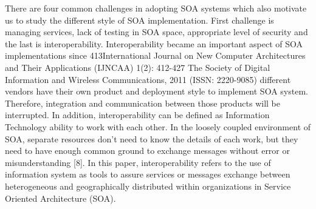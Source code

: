 \documentclass{SureshLimkar}
\begin{document}
\hspace{0.5 in}There are four common challenges in
adopting SOA systems which also
motivate us to study the different style of
SOA implementation. First challenge is
managing services, lack of testing in
SOA space, appropriate level of security
and the last is interoperability.
Interoperability became an important
aspect of SOA implementations since
413International Journal on New Computer Architectures and Their Applications (IJNCAA) 1(2): 412-427
The Society of Digital Information and Wireless Communications, 2011 (ISSN: 2220-9085)
different vendors have their own product
and deployment style to implement SOA
system. Therefore, integration and
communication between those products
will be interrupted. In addition,
interoperability can be defined as
Information Technology ability to work
with each other. In the loosely coupled
environment of SOA, separate resources
don't need to know the details of each
work, but they need to have enough
common ground to exchange messages
without error or misunderstanding [8]. In
this paper, interoperability refers to the
use of information system as tools to
assure services or messages exchange
between
heterogeneous
and
geographically
distributed
within
organizations in Service Oriented
Architecture (SOA).
\end{document}
